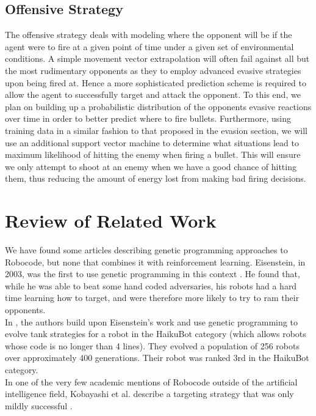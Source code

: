 \documentclass{article}
\theoremstyle{plain}
\theoremstyle{definition}
\theoremstyle{remark}
\begin{document}
\subsection*{Offensive Strategy}
The offensive strategy deals with modeling where the opponent will be if the agent were to fire at a given point of time under a given set of environmental conditions. A simple movement vector extrapolation will often fail against all but the most rudimentary opponents as they to employ advanced evasive strategies upon being fired at. Hence a more sophisticated prediction scheme is required to allow the agent to successfully target and attack the opponent. To this end, we plan on building up a probabilistic distribution of the opponents evasive reactions over time in order to better predict where to fire bullets. Furthermore, using training data in a similar fashion to that proposed in the evasion section, we will use an additional support vector machine to determine what situations lead to maximum likelihood of hitting the enemy when firing a bullet. This will ensure we only attempt to shoot at an enemy when we have a good chance of hitting them, thus reducing the amount of energy lost from making bad firing decisions. 
 
\section{Review of Related Work}
We have found some articles describing genetic programming approaches to Robocode, but none that combines it with reinforcement learning. Eisenstein, in 2003, was the first to use genetic programming in this context \cite{gp2}. He found that, while he was able to beat some hand coded adversaries, his robots had a hard time learning how to target, and were therefore more likely to try to ram their opponents.\\

In \cite{gp1}, the authors build upon Eisenstein's work and use genetic programming to evolve tank strategies for a robot in the HaikuBot category (which allows robots whose code is no longer than 4 lines). They evolved a population of 256 robots over approximately 400 generations. Their robot was ranked 3rd in the HaikuBot category.\\

In one of the very few academic mentions of Robocode outside of the artificial intelligence field, Kobayashi et al. describe a targeting strategy that was only mildly successful \cite{strategies}. \\
\end{document}

